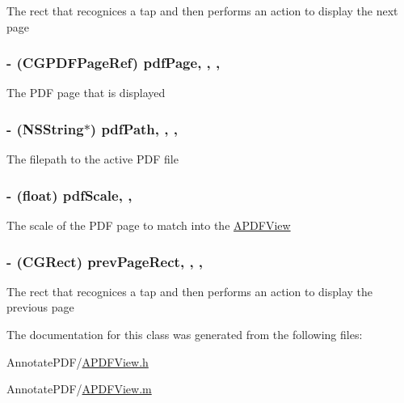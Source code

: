 The rect that recognices a tap and then performs an action to display the next page \hypertarget{interface_a_p_d_f_view_a212b6e8af54a7ff05d615a21e6ebc060}{
\subsubsection[{pdf\-Page}]{\setlength{\rightskip}{0pt plus 5cm}-\/ (C\-G\-P\-D\-F\-Page\-Ref) pdf\-Page\hspace{0.3cm}{\ttfamily [read]}, {\ttfamily [write]}, {\ttfamily [nonatomic]}, {\ttfamily [assign]}}}\label{interface_a_p_d_f_view_a212b6e8af54a7ff05d615a21e6ebc060}
The P\-D\-F page that is displayed \hypertarget{interface_a_p_d_f_view_acc47c24f2e2edd6fc251380ab4ac41b2}{
\subsubsection[{pdf\-Path}]{\setlength{\rightskip}{0pt plus 5cm}-\/ (N\-S\-String$\ast$) pdf\-Path\hspace{0.3cm}{\ttfamily [read]}, {\ttfamily [write]}, {\ttfamily [nonatomic]}, {\ttfamily [retain]}}}\label{interface_a_p_d_f_view_acc47c24f2e2edd6fc251380ab4ac41b2}
The filepath to the active P\-D\-F file \hypertarget{interface_a_p_d_f_view_a17160b472ff2e9a7d4cbbd30f5db22c5}{
\subsubsection[{pdf\-Scale}]{\setlength{\rightskip}{0pt plus 5cm}-\/ (float) pdf\-Scale\hspace{0.3cm}{\ttfamily [read]}, {\ttfamily [write]}, {\ttfamily [atomic]}}}\label{interface_a_p_d_f_view_a17160b472ff2e9a7d4cbbd30f5db22c5}
The scale of the P\-D\-F page to match into the \hyperlink{interface_a_p_d_f_view}{A\-P\-D\-F\-View} \hypertarget{interface_a_p_d_f_view_a6b63fc09909583cc1b39cb80c739caa5}{
\subsubsection[{prev\-Page\-Rect}]{\setlength{\rightskip}{0pt plus 5cm}-\/ (C\-G\-Rect) prev\-Page\-Rect\hspace{0.3cm}{\ttfamily [read]}, {\ttfamily [write]}, {\ttfamily [nonatomic]}, {\ttfamily [assign]}}}\label{interface_a_p_d_f_view_a6b63fc09909583cc1b39cb80c739caa5}
The rect that recognices a tap and then performs an action to display the previous page 

The documentation for this class was generated from the following files\-:\begin{DoxyCompactItemize}
\item 
Annotate\-P\-D\-F/\hyperlink{_a_p_d_f_view_8h}{A\-P\-D\-F\-View.\-h}\item 
Annotate\-P\-D\-F/\hyperlink{_a_p_d_f_view_8m}{A\-P\-D\-F\-View.\-m}\end{DoxyCompactItemize}
